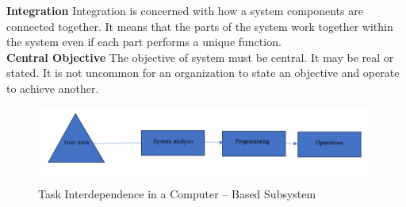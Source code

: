 \documentclass[a4paper,12pt]{report}
\begin{document}
\textbf{Integration}
Integration is concerned with how a system components are connected together. It means that the parts of the system work together within the system even if each part performs a unique function.\\

\textbf{Central Objective}
The objective of system must be central. It may be real or stated. It is not uncommon for an organization to state an objective and operate to achieve another.\\
\begin{figure}[h]
	\centering
	\includegraphics[width=0.7\linewidth]{1}
	\caption{Task Interdependence in a Computer – Based Subsystem }
	\label{fig:1}
\end{figure}
\end{document}
